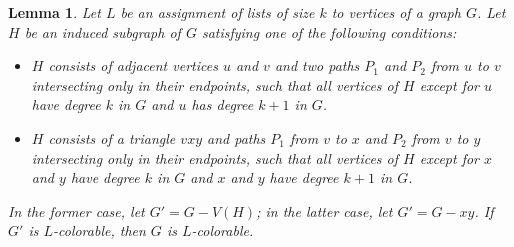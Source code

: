 \documentclass[12pt,twoside,openright,a4paper]{book}
\newtheorem{lemma}[theorem]{Lemma}
\begin{document}
\begin{lemma}\label{lemma:diamredu}
Let $L$ be an assignment of lists of size $k$ to vertices of a graph $G$.  Let $H$ be an induced subgraph of $G$ satisfying one of the following
conditions:
\begin{itemize}
\item[\textrm{(a)}] $H$ consists of adjacent vertices $u$ and $v$ and two paths $P_1$ and $P_2$ from $u$ to $v$ intersecting only in their
endpoints, such that all vertices of $H$ except for $u$ have degree $k$ in $G$ and $u$ has degree $k+1$ in $G$.
\item[\textrm{(b)}] $H$ consists of a triangle $vxy$ and paths $P_1$ from $v$ to $x$ and $P_2$ from $v$ to $y$ intersecting only in their
endpoints, such that all vertices of $H$ except for $x$ and $y$ have degree $k$ in $G$ and $x$ and $y$ have degree $k+1$ in $G$.
\end{itemize}
In the former case, let $G'=G-V(H)$; in the latter case, let $G'=G-xy$.  If $G'$ is $L$-colorable, then $G$ is $L$-colorable.
\end{lemma}
\end{document}

